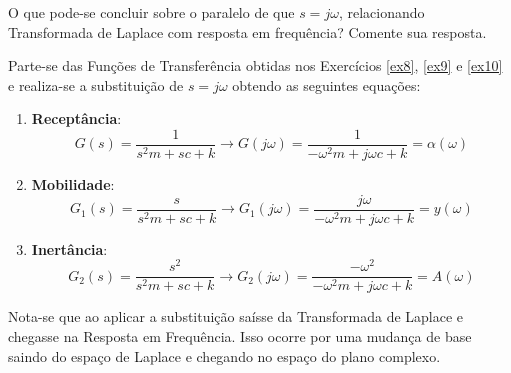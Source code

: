 \documentclass{article}
\begin{document}
\newpage
\begin{exercise}\label{ex13}
    O que pode-se concluir sobre o paralelo de que $s = j\omega$, relacionando Transformada de Laplace com resposta em frequência? Comente sua resposta.
\end{exercise}
\begin{resolution}
    Parte-se das Funções de Transferência obtidas nos Exercícios \ref{ex8}, \ref{ex9} e \ref{ex10} e realiza-se a substituição de $s = j\omega$ obtendo as seguintes equações:
    \begin{enumerate}
        \item \textbf{Receptância}:
        \begin{equation}
            G(s) = \frac{1}{s^2m + sc + k} \to \boxed{G(j\omega) = \frac{1}{-\omega^2m + j\omega c + k} = \alpha(\omega)}
        \end{equation}

        \item \textbf{Mobilidade}:
        \begin{equation}
            G_1(s) = \frac{s}{s^2m + sc + k} \to \boxed{G_1(j\omega) = \frac{j\omega}{-\omega^2m + j\omega c + k} = y(\omega)}
        \end{equation}

        \item \textbf{Inertância}:
        \begin{equation}
            G_2(s) = \frac{s^2}{s^2m + sc + k} \to \boxed{G_2(j\omega) = \frac{-\omega^2}{-\omega^2m + j\omega c + k} = A(\omega)}
        \end{equation}
    \end{enumerate}
    Nota-se que ao aplicar a substituição saísse da Transformada de Laplace e chegasse na Resposta em Frequência. Isso ocorre por uma mudança de base saindo do espaço de Laplace e chegando no espaço do plano complexo.
\end{resolution}
\end{document}
